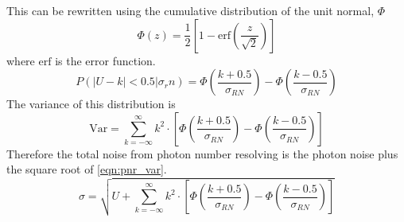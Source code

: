 This can be rewritten using the cumulative distribution of the unit normal, $\Phi$
\begin{equation}
    \Phi(z) = \frac12 \left[1 - \mathrm{erf}\left(\frac{z}{\sqrt{2}}\right) \right]
\end{equation}
where $\mathrm{erf}$ is the error function.
\begin{equation}
    P(|U - k| < 0.5 | \sigma_rn) = \Phi\left(\frac{k + 0.5}{\sigma_{RN}} \right) - \Phi\left(\frac{k - 0.5}{\sigma_{RN}} \right)
\end{equation}
The variance of this distribution is
\begin{equation}
\label{eqn:pnr_var}
\mathrm{Var} = \sum_{k=-\infty}^{\infty}{ k^2\cdot \left[\Phi\left(\frac{k + 0.5}{\sigma_{RN}} \right) - \Phi\left(\frac{k - 0.5}{\sigma_{RN}}\right)\right]}
\end{equation}
Therefore the total noise from photon number resolving is the photon noise plus the square root of \autoref{eqn:pnr_var}.
\begin{equation}
    \label{eqn:pnr_std}
    \sigma = \sqrt{U + \sum_{k=-\infty}^{\infty}{ k^2\cdot \left[\Phi\left(\frac{k + 0.5}{\sigma_{RN}} \right) - \Phi\left(\frac{k - 0.5}{\sigma_{RN}}\right)\right]}}
\end{equation}
